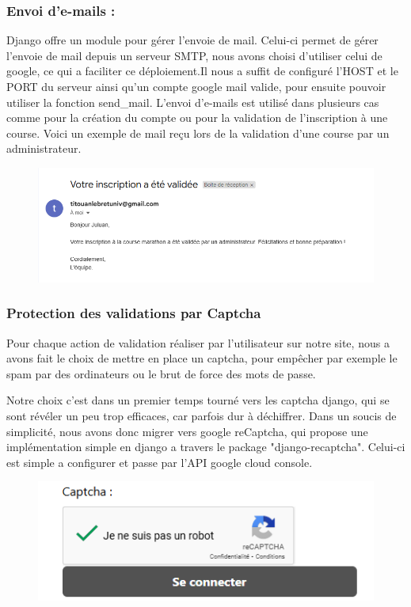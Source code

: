 \documentclass[12pt]{article} %
\begin{document}
        \subsubsection{Envoi d’e-mails :}
            Django offre un module pour gérer l'envoie de mail. Celui-ci permet de gérer l'envoie de mail depuis un serveur SMTP, nous avons choisi d'utiliser celui de google, ce qui a faciliter ce déploiement.Il nous a suffit de configuré l'HOST et le PORT du serveur ainsi qu'un compte google mail valide, pour ensuite pouvoir utiliser la fonction send\_mail.
            L’envoi d’e-mails est utilisé dans plusieurs cas comme pour la création du compte ou pour la validation de l’inscription à une course. Voici un exemple de mail reçu lors de la validation d'une course par un administrateur.
    
            \begin{figure}[hbtp]
            \centering
            \includegraphics[scale=0.8]{images/validationMAIL.PNG}
            \end{figure}

        \subsubsection{Protection des validations par Captcha}
            Pour chaque action de validation réaliser par l'utilisateur sur notre site, nous a avons fait le choix de mettre en place un captcha, pour empêcher par exemple le spam par des ordinateurs ou le brut de force des mots de passe.
            
            Notre choix c'est dans un premier temps tourné vers les captcha django, qui se sont révéler un peu trop efficaces, car parfois dur à déchiffrer. Dans un soucis de simplicité, nous avons donc migrer vers google reCaptcha, qui propose une implémentation simple en django a travers le package "django-recaptcha". Celui-ci est simple a configurer et passe par l'API google cloud console.
            \begin{figure}[hbtp]
            \centering
            \includegraphics[scale=0.8]{images/Capture_captcha.PNG}
            \end{figure}
            
\end{document}
